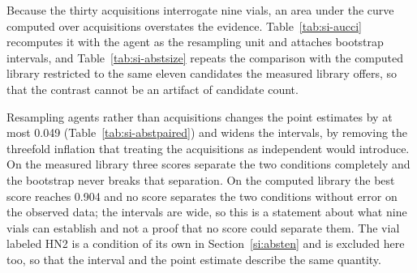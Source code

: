 \documentclass[11pt]{article}
\begin{document}
Because the thirty acquisitions interrogate nine vials, an area under the curve computed
over acquisitions overstates the evidence. Table~\ref{tab:si-aucci} recomputes it with the
agent as the resampling unit and attaches bootstrap intervals, and
Table~\ref{tab:si-abstsize} repeats the comparison with the computed library restricted to
the same eleven candidates the measured library offers, so that the contrast cannot be an
artifact of candidate count.

\begin{table}[htbp]
\centering
\caption{Separation between the class-present and the class-absent condition, with the agent as the resampling unit. Intervals are 5000 bootstrap replicates over agents.}
\label{tab:si-aucci}
\footnotesize
{}

\begin{flushleft}\footnotesize Resampling agents rather than acquisitions changes the point estimates by at most 0.049 (Table~\ref{tab:si-abstpaired}) and widens the intervals, by removing the threefold inflation that treating the acquisitions as independent would introduce. On the measured library three scores separate the two conditions completely and the bootstrap never breaks that separation. On the computed library the best score reaches 0.904 and no score separates the two conditions without error on the observed data; the intervals are wide, so this is a statement about what nine vials can establish and not a proof that no score could separate them. The vial labeled HN2 is a condition of its own in Section~\ref{si:absten} and is excluded here too, so that the interval and the point estimate describe the same quantity.\end{flushleft}
\end{table}
\end{document}
